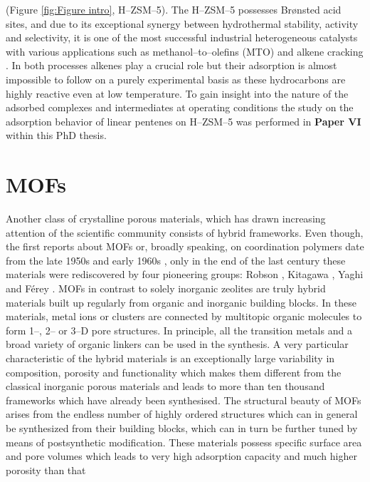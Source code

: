 (Figure \ref{fig:Figure intro}, H--ZSM--5). The H--ZSM--5 possesses Br\o{}nsted
acid sites, and due to its exceptional synergy between hydrothermal stability,
activity and selectivity, it is one of the most successful industrial
heterogeneous catalysts with various applications such as methanol--to--olefins
(MTO) and alkene cracking \cite{Olsbye2012, Lefevere2014}. In both processes alkenes play a crucial role but their adsorption is almost impossible to follow on a purely experimental basis as these hydrocarbons are highly reactive even at low temperature. To gain insight into the nature of the adsorbed complexes and intermediates at operating conditions the study on the adsorption
behavior of linear pentenes on H--ZSM--5 was performed in \textbf{Paper VI}
within this PhD thesis.


\section{MOFs}
Another class of crystalline porous materials, which has drawn increasing
attention of the scientific community consists of hybrid frameworks. Even
though, the first reports about MOFs or, broadly speaking, on coordination
polymers date from the late 1950s and early 1960s \cite{Knobloch1959,
Berlin1960, Kubo1960, Block1962, Tomic1965, Kinoshita1959}, only in the end of
the last century these materials were rediscovered by four pioneering groups:
Robson \cite{Hoskins1990, Batten1995}, Kitagawa \cite{Kitagawa1991,
Kitagawa1993}, Yaghi \cite{Yaghi1995} and F\'erey \cite{Riou1998}. MOFs in
contrast to solely inorganic zeolites are truly hybrid materials built up regularly from organic and inorganic building blocks.
In these materials, metal ions or clusters are connected by multitopic organic molecules to form
1--, 2-- or 3--D pore structures.
In principle, all the transition metals and a broad variety of organic linkers
can be used in the synthesis. A very particular characteristic of the hybrid
materials is an exceptionally large variability in composition, porosity and
functionality which makes them different from the classical inorganic porous
materials and leads to more than ten thousand frameworks which have already been
synthesised.
The structural beauty of MOFs arises from the endless number of highly ordered structures which can in general be synthesized from their
building blocks, which can in turn be further tuned by means of postsynthetic
modification. These materials possess specific surface area and pore volumes
which leads to very high adsorption capacity and much higher porosity than that
